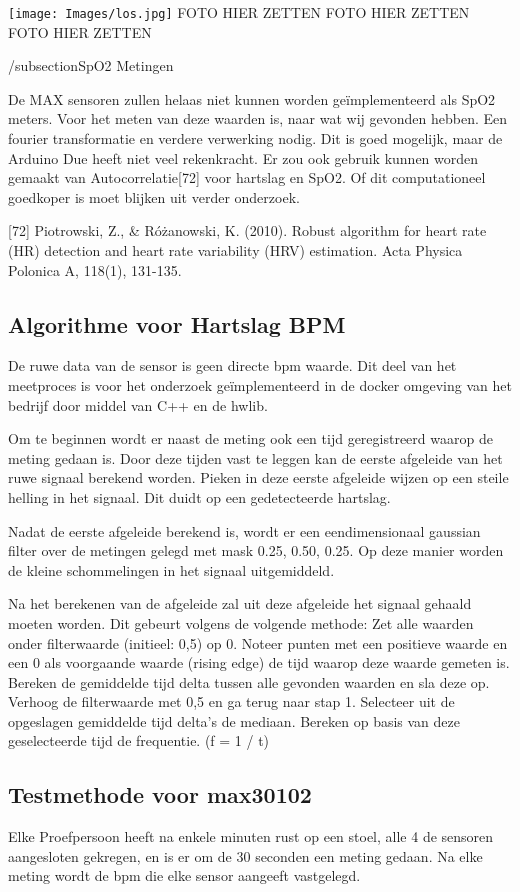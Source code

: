 \documentclass[11pt]{article}
\begin{document}
    \texttt{[image: Images/los.jpg]}
FOTO HIER ZETTEN
FOTO HIER ZETTEN
FOTO HIER ZETTEN

/subsection{SpO2 Metingen}

De MAX sensoren zullen helaas niet kunnen worden geïmplementeerd als SpO2 meters. Voor het meten van deze waarden is, naar wat wij gevonden hebben. Een fourier transformatie en verdere verwerking nodig. Dit is goed mogelijk, maar de Arduino Due heeft niet veel rekenkracht. Er zou ook gebruik kunnen worden gemaakt van Autocorrelatie[72] voor hartslag en SpO2. Of dit computationeel goedkoper is moet blijken uit verder onderzoek. 


[72] Piotrowski, Z., & Różanowski, K. (2010). Robust algorithm for heart rate (HR) detection and heart rate variability (HRV) estimation. Acta Physica Polonica A, 118(1), 131-135.

\subsection{Algorithme voor Hartslag BPM}
De ruwe data van de sensor is geen directe bpm waarde. Dit deel van het meetproces is voor het onderzoek geïmplementeerd in de docker omgeving van het bedrijf door middel van C++ en de hwlib. 

Om te beginnen wordt er naast de meting ook een tijd geregistreerd waarop de meting gedaan is. Door deze tijden vast te leggen kan de eerste afgeleide van het ruwe signaal berekend worden. Pieken in deze eerste afgeleide wijzen op een steile helling in het signaal. Dit duidt op een gedetecteerde hartslag.

Nadat de eerste afgeleide berekend is, wordt er een eendimensionaal gaussian filter over de metingen gelegd met mask {0.25, 0.50, 0.25}. Op deze manier worden de kleine schommelingen in het signaal uitgemiddeld.

Na het berekenen van de afgeleide zal uit deze afgeleide het signaal gehaald moeten worden.
Dit gebeurt volgens de volgende methode:
Zet alle waarden onder filterwaarde (initieel: 0,5) op 0.
Noteer punten met een positieve waarde en een 0 als voorgaande waarde (rising edge) de tijd waarop deze waarde gemeten is.
Bereken de gemiddelde tijd delta tussen alle gevonden waarden en sla deze op.
Verhoog de filterwaarde met 0,5 en ga terug naar stap 1.
Selecteer uit de opgeslagen gemiddelde tijd delta’s de mediaan.
Bereken op basis van deze geselecteerde tijd de frequentie. (f = 1 / t)


\subsection{Testmethode voor max30102}
Elke Proefpersoon heeft na enkele minuten rust op een stoel, alle 4 de sensoren aangesloten gekregen, en is er om de 30 seconden een meting gedaan. Na elke meting wordt de bpm die elke sensor aangeeft vastgelegd.
\end{document}
